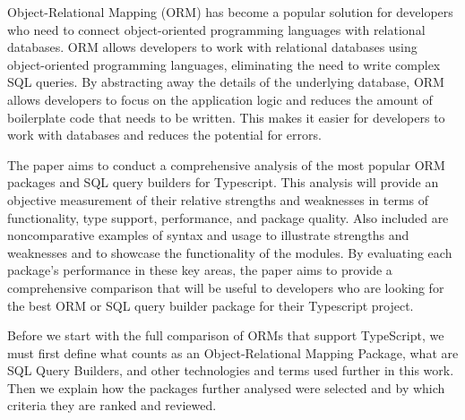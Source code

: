 Object-Relational Mapping (ORM) has become a popular solution for developers who need to connect object-oriented programming languages with relational databases. ORM allows developers to work with relational databases using object-oriented programming languages, eliminating the need to write complex SQL queries. By abstracting away the details of the underlying database, ORM allows developers to focus on the application logic and reduces the amount of boilerplate code that needs to be written. This makes it easier for developers to work with databases and reduces the potential for errors. \par
The paper aims to conduct a comprehensive analysis of the most popular ORM packages and SQL query builders for Typescript. This analysis will provide an objective measurement of their relative strengths and weaknesses in terms of functionality, type support, performance, and package quality. Also included are noncomparative examples of syntax and usage to illustrate strengths and weaknesses and to showcase the functionality of the modules. By evaluating each package's performance in these key areas, the paper aims to provide a comprehensive comparison that will be useful to developers who are looking for the best ORM or SQL query builder package for their Typescript project.\par
Before we start with the full comparison of ORMs that support TypeScript, we must first define what counts as an Object-Relational Mapping Package, what are SQL Query Builders, and other technologies and terms used further in this work. Then we explain how the packages further analysed were selected and by which criteria they are ranked and reviewed.\par
